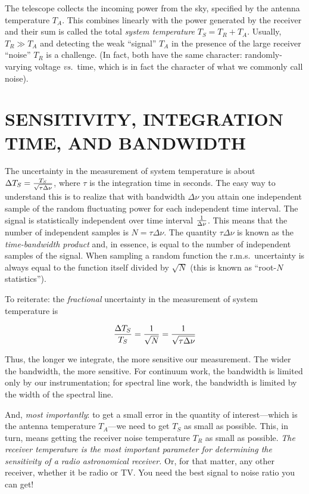\documentclass[psfig,preprint]{aastex}
\begin{document}
	The telescope collects the incoming power from the sky,
specified by the antenna temperature $T_A$. This combines linearly with
the power generated by the receiver and their sum is called the total
{\it system temperature} $T_S = T_R + T_A$.  Usually, $T_R \gg T_A$ and
detecting the weak ``signal'' $T_A$ in the presence of the large
receiver ``noise'' $T_R$ is a challenge.  (In fact, both have the same
character: randomly-varying voltage {\it vs.}\ time, which is in fact the
character of what we commonly call noise). 

\section {SENSITIVITY, INTEGRATION TIME, AND BANDWIDTH} 

	The uncertainty in the measurement of system temperature is
about $\Delta T_S = {T_S \over \sqrt {\tau \Delta \nu}}$, where $\tau$
is the integration time in seconds.  The easy way to understand this is
to realize that with bandwidth $\Delta \nu$ you attain one independent
sample of the random fluctuating power for each independent time
interval. The signal is statistically independent over time interval ${1
\over \Delta \nu}$.  This means that the number of independent samples
is $N = \tau \Delta \nu$.  The quantity $\tau \Delta \nu$ is known as
the {\it time-bandwidth product} and, in essence, is equal to the number
of independent samples of the signal.  When sampling a random function
the r.m.s.\ uncertainty is always equal to the function itself divided
by $\sqrt N$ (this is known as ``root-$N$ statistics''). 

	To reiterate: the {\it fractional} uncertainty in the
measurement of system temperature is 

\begin{equation} {\Delta T_S \over T_S} = {1 \over \sqrt N} = {1 \over
\sqrt {\tau \Delta \nu}} 
\end{equation}

\noindent Thus, the longer we integrate, the more sensitive our
measurement.  The wider the bandwidth, the more sensitive.  For
continuum work, the bandwidth is limited only by our instrumentation;
for spectral line work, the bandwidth is limited by the width of the
spectral line. 

	And, {\it most importantly}: to get a small error in the
quantity of interest---which is the antenna temperature $T_A$---we need
to get $T_S$ as small as possible. This, in turn, means getting the
receiver noise temperature $T_R$ as small as possible. {\it The receiver
temperature is the most important parameter for determining the
sensitivity of a radio astronomical receiver.} Or, for that matter, any
other receiver, whether it be radio or TV. You need the best signal to
noise ratio you can get!
\end{document}
